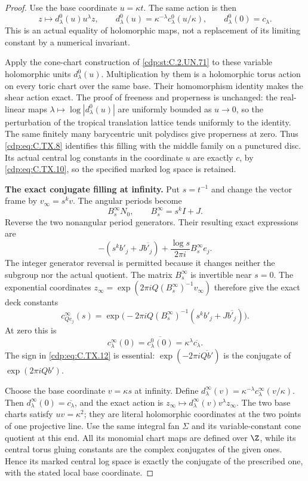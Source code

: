 \begin{proof}
Use the base coordinate $u=\kappa t$.
The same action is then
\[
 z\longmapsto d^0_\lambda(u)u^\lambda z,
 \qquad
 d^0_\lambda(u)=\kappa^{-\lambda}
                    c^0_\lambda(u/\kappa),
 \qquad d^0_\lambda(0)=c_\lambda.
\tag{C.TX.10}\label{cdp:eq:C.TX.10}
\]
This is an actual equality of holomorphic
maps, not a replacement of its limiting
constant by a numerical invariant.

Apply the cone-chart construction of
\ref{cdp:st:C.2.UN.71} to these variable holomorphic
units $d^0_\lambda(u)$. Multiplication
by them is a holomorphic torus action
on every toric chart over the same
base. Their homomorphism identity
makes the shear action exact. The
proof of freeness and properness is
unchanged: the real-linear maps
$\lambda\mapsto\log|d^0_\lambda(u)|$
are uniformly bounded as $u\to0$,
so the perturbation of the tropical
translation lattice tends uniformly
to the identity. The same finitely
many barycentric unit polydiscs give
properness at zero. Thus \eqref{cdp:eq:C.TX.8}
identifies this filling with the
middle family on a punctured disc.
Its actual central log constants in
the coordinate $u$ are exactly $c$,
by \eqref{cdp:eq:C.TX.10}, so the specified
marked log space is retained.

\par\medskip\noindent\textbf{The exact conjugate filling at infinity.}
Put $s=t^{-1}$ and change the vector
frame by $v_\infty=s^kv$. The angular
periods become
\[
 B^\infty_sN_0,
       \qquad B^\infty_s=s^kI+J.
\tag{C.TX.11}\label{cdp:eq:C.TX.11}
\]
Reverse the two nonangular period
generators. Their resulting exact
expressions are
\[
 -(s^kb'_j+J\overline{b'_j})
                +\frac{\log s}{2\pi i}B^\infty_se_j.
\tag{C.TX.12}\label{cdp:eq:C.TX.12}
\]
The integer generator reversal is
permitted because it changes neither
the subgroup nor the actual quotient.
The matrix $B^\infty_s$ is invertible
near $s=0$. The exponential coordinates
$z_\infty=\exp(2\pi iQ(B^\infty_s)^{-1}v_\infty)$
therefore give the exact deck constants
\[
 c^\infty_{Qe_j}(s)=
  \exp\bigl(-2\pi iQ(B^\infty_s)^{-1}
                  (s^kb'_j+J\overline{b'_j})\bigr).
\tag{C.TX.13}\label{cdp:eq:C.TX.13}
\]
At zero this is
\[
 c^\infty_\lambda(0)
       =\overline{c^0_\lambda(0)}
       =\kappa^\lambda\overline{c_\lambda}.
\tag{C.TX.14}\label{cdp:eq:C.TX.14}
\]
The sign in \eqref{cdp:eq:C.TX.12} is essential:
$\exp(-2\pi i\overline{Qb'})$
is the conjugate of $\exp(2\pi iQb')$.

Choose the base coordinate $v=\kappa s$
at infinity. Define
$d^\infty_\lambda(v)=\kappa^{-\lambda}
c^\infty_\lambda(v/\kappa)$.
Then $d^\infty_\lambda(0)=\overline{c_\lambda}$,
and the exact action is
$z_\infty\mapsto d^\infty_\lambda(v)v^\lambda z_\infty$.
The two base charts satisfy $uv=\kappa^2$;
they are literal holomorphic coordinates
at the two points of one projective line.
Use the same integral fan $\Sigma$ and
its variable-constant cone quotient
at this end. All its monomial chart
maps are defined over $\Z$, while its
central torus gluing constants are
the complex conjugates of the given
ones. Hence its marked central log
space is exactly the conjugate of
the prescribed one, with the stated
local base coordinate.


\end{proof}
